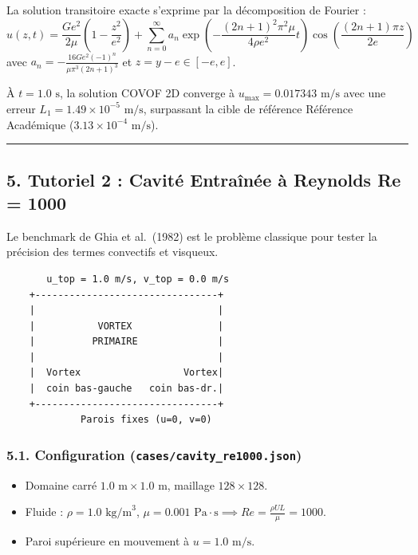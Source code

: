 \documentclass[
  french,
]{article}
\providecommand{\tightlist}{%
  \setlength{\itemsep}{0pt}\setlength{\parskip}{0pt}}
\begin{document}
La solution transitoire exacte s'exprime par la décomposition de Fourier
:
\[u(z, t) = \frac{G e^2}{2\mu} \left( 1 - \frac{z^2}{e^2} \right) + \sum_{n=0}^{\infty} a_n \exp\left( - \frac{(2n+1)^2 \pi^2 \mu}{4 \rho e^2} t \right) \cos\left( \frac{(2n+1) \pi z}{2e} \right)\]
avec \(a_n = -\frac{16 G e^2 (-1)^n}{\mu \pi^3 (2n+1)^3}\) et
\(z = y - e \in [-e, e]\).

À \(t = 1.0\text{ s}\), la solution COVOF 2D converge à
\(u_{\max} = 0.017343\text{ m/s}\) avec une erreur
\(L_1 = 1.49 \times 10^{-5}\text{ m/s}\), surpassant la cible de
référence Référence Académique (\(3.13 \times 10^{-4}\text{ m/s}\)).

\begin{center}\rule{0.5\linewidth}{0.5pt}\end{center}

\subsection{5. Tutoriel 2 : Cavité Entraînée à Reynolds Re =
1000}\label{tutoriel-2-cavituxe9-entrauxeenuxe9e-uxe0-reynolds-re-1000}

Le benchmark de Ghia et al.~(1982) est le problème classique pour tester
la précision des termes convectifs et visqueux.

\begin{verbatim}
       u_top = 1.0 m/s, v_top = 0.0 m/s
    +--------------------------------+
    |                                |
    |           VORTEX               |
    |          PRIMAIRE              |
    |                                |
    |  Vortex                  Vortex|
    |  coin bas-gauche   coin bas-dr.|
    +--------------------------------+
             Parois fixes (u=0, v=0)
\end{verbatim}

\subsubsection{\texorpdfstring{5.1. Configuration
(\texttt{cases/cavity\_re1000.json})}{5.1. Configuration (cases/cavity\_re1000.json)}}\label{configuration-casescavity_re1000.json}

\begin{itemize}
\tightlist
\item
  Domaine carré \(1.0\text{ m} \times 1.0\text{ m}\), maillage
  \(128 \times 128\).
\item
  Fluide : \(\rho = 1.0\text{ kg/m}^3\),
  \(\mu = 0.001\text{ Pa}\cdot\text{s} \implies Re = \frac{\rho U L}{\mu} = 1000\).
\item
  Paroi supérieure en mouvement à \(u = 1.0\text{ m/s}\).
\end{itemize}
\end{document}
